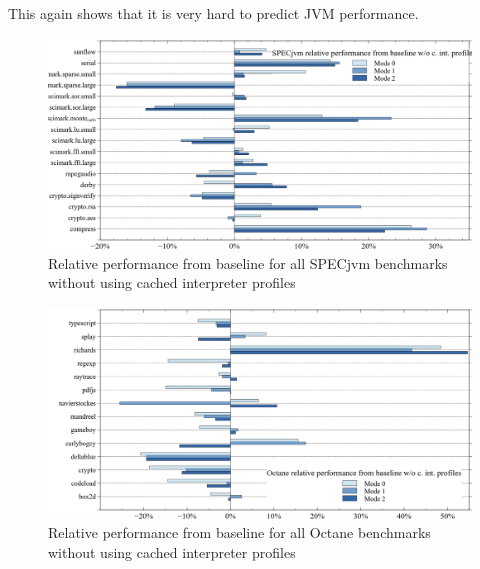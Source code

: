 This again shows that it is very hard to predict JVM performance.
\begin{figure}[ht]
  \begin{center}
    \centering
    \includegraphics[width=1.0\textwidth]{figures/all_warmup_variation_wo_i.png}
    \caption{Relative performance from baseline for all SPECjvm benchmarks without using cached interpreter profiles}
    \label{f:others_warmup_wo_i}
  \end{center}
\end{figure}
\begin{figure}[ht]
  \begin{center}
    \centering
    \includegraphics[width=1.0\textwidth]{figures/octane_variation_wo_i.png}
    \caption{Relative performance from baseline for all Octane benchmarks without using cached interpreter profiles}
    \label{f:octane_wo_i}
  \end{center}
\end{figure}
\clearpage
